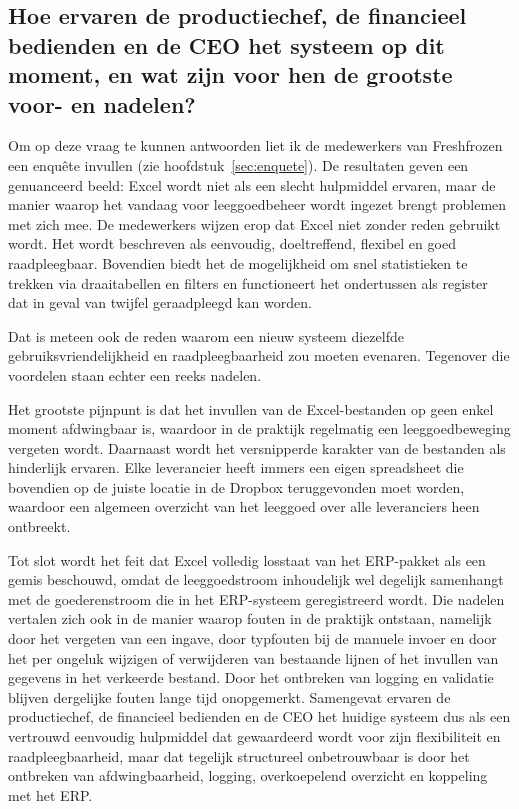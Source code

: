 \subsection{Hoe ervaren de productiechef, de financieel bedienden en de CEO het systeem op dit moment, en wat zijn voor hen de grootste voor- en nadelen?}

Om op deze vraag te kunnen antwoorden liet ik de medewerkers van Freshfrozen een enquête invullen (zie hoofdstuk~\ref{sec:enquete}). De resultaten geven een genuanceerd beeld: Excel wordt niet als een slecht hulpmiddel ervaren, maar de manier waarop het vandaag voor leeggoedbeheer wordt ingezet brengt problemen met zich mee. De medewerkers wijzen erop dat Excel niet zonder reden gebruikt wordt. Het wordt beschreven als eenvoudig, doeltreffend, flexibel en goed raadpleegbaar. Bovendien biedt het de mogelijkheid om snel statistieken te trekken via draaitabellen en filters en functioneert het ondertussen als register dat in geval van twijfel geraadpleegd kan worden.

Dat is meteen ook de reden waarom een nieuw systeem diezelfde gebruiksvriendelijkheid en raadpleegbaarheid zou moeten evenaren. Tegenover die voordelen staan echter een reeks nadelen.

Het grootste pijnpunt is dat het invullen van de Excel-bestanden op geen enkel moment afdwingbaar is, waardoor in de praktijk regelmatig een leeggoedbeweging vergeten wordt. Daarnaast wordt het versnipperde karakter van de bestanden als hinderlijk ervaren. Elke leverancier heeft immers een eigen spreadsheet die bovendien op de juiste locatie in de Dropbox teruggevonden moet worden, waardoor een algemeen overzicht van het leeggoed over alle leveranciers heen ontbreekt.

Tot slot wordt het feit dat Excel volledig losstaat van het ERP-pakket als een gemis beschouwd, omdat de leeggoedstroom inhoudelijk wel degelijk samenhangt met de goederenstroom die in het ERP-systeem geregistreerd wordt. Die nadelen vertalen zich ook in de manier waarop fouten in de praktijk ontstaan, namelijk door het vergeten van een ingave, door typfouten bij de manuele invoer en door het per ongeluk wijzigen of verwijderen van bestaande lijnen of het invullen van gegevens in het verkeerde bestand. Door het ontbreken van logging en validatie blijven dergelijke fouten lange tijd onopgemerkt.
Samengevat ervaren de productiechef, de financieel bedienden en de CEO het huidige systeem dus als een vertrouwd eenvoudig hulpmiddel dat gewaardeerd wordt voor zijn flexibiliteit en raadpleegbaarheid, maar dat tegelijk structureel onbetrouwbaar is door het ontbreken van afdwingbaarheid, logging, overkoepelend overzicht en koppeling met het ERP.

